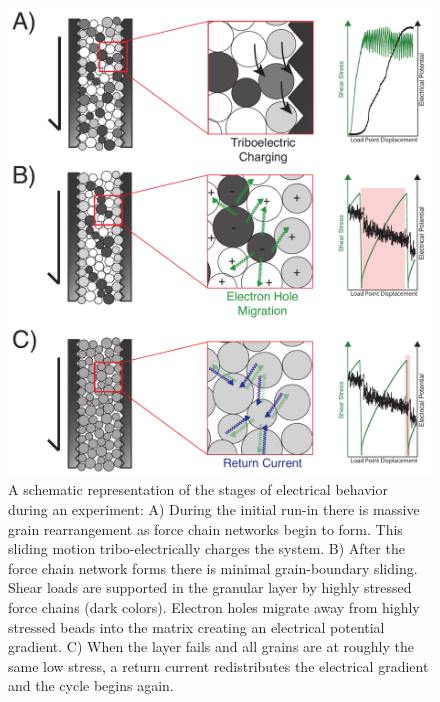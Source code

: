\begin{figure}
\includegraphics[width=30pc]{chap_electrical/model_cartoon.pdf}
\caption{A schematic representation of the stages of electrical behavior during an experiment:  A) During the initial run-in there is massive grain rearrangement as force chain networks begin to form.  This sliding motion tribo-electrically charges the system.  B) After the force chain network forms there is minimal grain-boundary sliding.  Shear loads are supported in the granular layer by highly stressed force chains (dark colors).  Electron holes migrate away from highly stressed beads into the matrix creating an electrical potential gradient.  C) When the layer fails and all grains are at roughly the same low stress, a return current redistributes the electrical gradient and the cycle begins again.}
\label{model_cartoon}
\end{figure}

